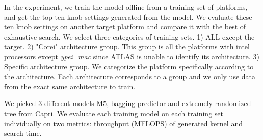 In the experiment, we train the model offline from a training set of platforms, and get the top ten knob settings generated from the model.
We evaluate these ten knob settings on another target platform and compare it with the best of exhaustive search. We select
three categories of training sets. 1) ALL except the target. 2) "Corei" architecture group. This group is all the platforms
with intel processors except \textit{ypei\_mac} since ATLAS is unable to identify its architecture. 3) Specific architecture group.
We categorize the platform specifically according to the architecture. Each architecture corresponds to a group and we only use data
from the exact same architecture to train. \par

We picked 3 different models M5, bagging predictor and extremely randomized tree from Capri. We evaluate each training model on each training 
set individually on two metrics: throughput (MFLOPS) of generated kernel and search time.\par


